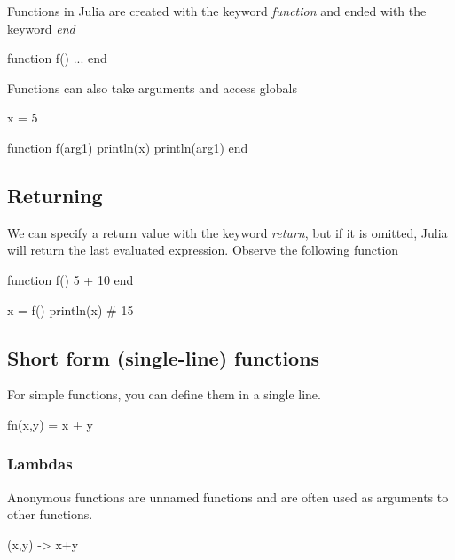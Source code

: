 \documentclass{report}
\begin{document}
    \bigbreak \noindent 
    Functions in Julia are created with the keyword \textit{function} and ended with the keyword \textit{end}
    \bigbreak \noindent 
    \begin{jlcode}
    function f()
        ...
    end
    \end{jlcode}
    \bigbreak \noindent 
    Functions can also take arguments and access globals
    \bigbreak \noindent 
    \begin{jlcode}
        x = 5

        function f(arg1)
            println(x)
            println(arg1)
        end
    \end{jlcode}
    \bigbreak \noindent 
    \subsection{Returning}
    \bigbreak \noindent 
    We can specify a return value with the keyword \textit{return}, but if it is omitted, Julia will return the last evaluated expression. Observe the following function
    \bigbreak \noindent 
    \begin{jlcode}
        function f()
            5 + 10
        end

        x = f()
        println(x) # 15
    \end{jlcode}
    \bigbreak \noindent 
    \subsection{Short form (single-line) functions}
    \bigbreak \noindent 
    For simple functions, you can define them in a single line.
    \bigbreak \noindent 
    \begin{jlcode}
    fn(x,y) = x + y 
    \end{jlcode}
    \bigbreak \noindent 
    \subsubsection{Lambdas}
    \bigbreak \noindent 
    Anonymous functions are unnamed functions and are often used as arguments to other functions.
    \bigbreak \noindent 
    \begin{jlcode}
        (x,y) -> x+y
    \end{jlcode}

    \bigbreak \noindent 
\end{document}

